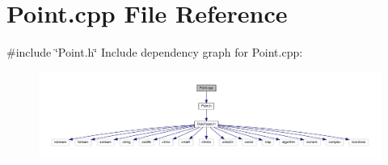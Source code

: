 \section{Point.\+cpp File Reference}
\label{_point_8cpp}
{\ttfamily \#include \char`\"{}Point.\+h\char`\"{}}\newline
Include dependency graph for Point.\+cpp\+:\nopagebreak
\begin{figure}[H]
\begin{center}
\leavevmode
\includegraphics[width=350pt]{_point_8cpp__incl}
\end{center}
\end{figure}
